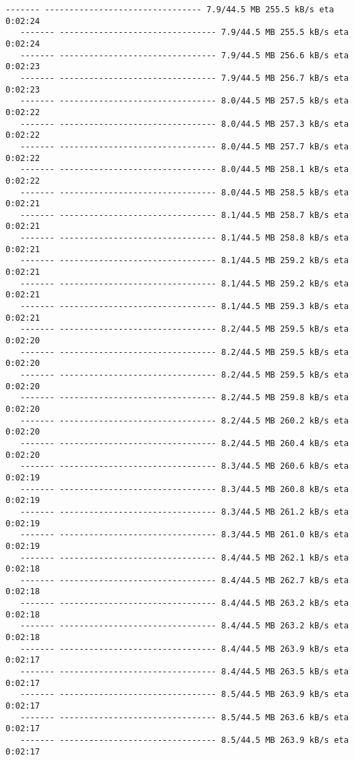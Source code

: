 \documentclass[11pt]{article}
\begin{document}
\begin{Verbatim}[commandchars=\\\{\}]
   ------- -------------------------------- 7.9/44.5 MB 255.5 kB/s eta 0:02:24
   ------- -------------------------------- 7.9/44.5 MB 255.5 kB/s eta 0:02:24
   ------- -------------------------------- 7.9/44.5 MB 256.6 kB/s eta 0:02:23
   ------- -------------------------------- 7.9/44.5 MB 256.7 kB/s eta 0:02:23
   ------- -------------------------------- 8.0/44.5 MB 257.5 kB/s eta 0:02:22
   ------- -------------------------------- 8.0/44.5 MB 257.3 kB/s eta 0:02:22
   ------- -------------------------------- 8.0/44.5 MB 257.7 kB/s eta 0:02:22
   ------- -------------------------------- 8.0/44.5 MB 258.1 kB/s eta 0:02:22
   ------- -------------------------------- 8.0/44.5 MB 258.5 kB/s eta 0:02:21
   ------- -------------------------------- 8.1/44.5 MB 258.7 kB/s eta 0:02:21
   ------- -------------------------------- 8.1/44.5 MB 258.8 kB/s eta 0:02:21
   ------- -------------------------------- 8.1/44.5 MB 259.2 kB/s eta 0:02:21
   ------- -------------------------------- 8.1/44.5 MB 259.2 kB/s eta 0:02:21
   ------- -------------------------------- 8.1/44.5 MB 259.3 kB/s eta 0:02:21
   ------- -------------------------------- 8.2/44.5 MB 259.5 kB/s eta 0:02:20
   ------- -------------------------------- 8.2/44.5 MB 259.5 kB/s eta 0:02:20
   ------- -------------------------------- 8.2/44.5 MB 259.5 kB/s eta 0:02:20
   ------- -------------------------------- 8.2/44.5 MB 259.8 kB/s eta 0:02:20
   ------- -------------------------------- 8.2/44.5 MB 260.2 kB/s eta 0:02:20
   ------- -------------------------------- 8.2/44.5 MB 260.4 kB/s eta 0:02:20
   ------- -------------------------------- 8.3/44.5 MB 260.6 kB/s eta 0:02:19
   ------- -------------------------------- 8.3/44.5 MB 260.8 kB/s eta 0:02:19
   ------- -------------------------------- 8.3/44.5 MB 261.2 kB/s eta 0:02:19
   ------- -------------------------------- 8.3/44.5 MB 261.0 kB/s eta 0:02:19
   ------- -------------------------------- 8.4/44.5 MB 262.1 kB/s eta 0:02:18
   ------- -------------------------------- 8.4/44.5 MB 262.7 kB/s eta 0:02:18
   ------- -------------------------------- 8.4/44.5 MB 263.2 kB/s eta 0:02:18
   ------- -------------------------------- 8.4/44.5 MB 263.2 kB/s eta 0:02:18
   ------- -------------------------------- 8.4/44.5 MB 263.9 kB/s eta 0:02:17
   ------- -------------------------------- 8.4/44.5 MB 263.5 kB/s eta 0:02:17
   ------- -------------------------------- 8.5/44.5 MB 263.9 kB/s eta 0:02:17
   ------- -------------------------------- 8.5/44.5 MB 263.6 kB/s eta 0:02:17
   ------- -------------------------------- 8.5/44.5 MB 263.9 kB/s eta 0:02:17

\end{Verbatim}
\end{document}
